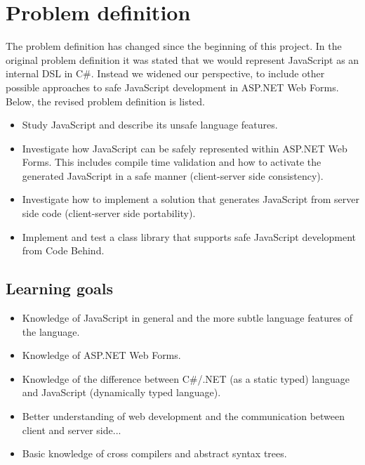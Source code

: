 \section{Problem definition}
	The problem definition has changed since the beginning of this project. In the original problem definition it was stated that we would represent JavaScript as an internal DSL in C\#. Instead we widened our perspective, to include other possible approaches to safe JavaScript development in ASP.NET Web Forms. Below, the revised problem definition is listed.
	\begin{itemize}

	\item Study JavaScript and describe its unsafe language features.

	\item Investigate how JavaScript can be safely represented within ASP.NET Web Forms. This includes compile time validation and how to activate the generated JavaScript in a safe manner (client-server side consistency).

	\item Investigate how to implement a solution that generates JavaScript from server side code (client-server side portability).

	\item Implement and test a class library that supports safe JavaScript development from Code Behind.


	\end{itemize}



	\subsection{Learning goals}
		\begin{itemize}

		\item Knowledge of JavaScript in general and the more subtle language features of the language.
		\item Knowledge of ASP.NET Web Forms.
	 	\item Knowledge of the difference between C\#/.NET (as a static typed) language and JavaScript (dynamically typed language).
		\item Better understanding of web development and the communication between client and server side...
		\item Basic knowledge of cross compilers and abstract syntax trees.
		\end{itemize}

